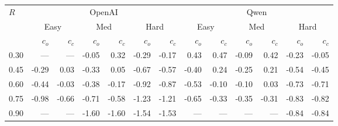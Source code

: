 \begin{tabular}{l*{12}{r}}
\toprule
  \multirow{2}{*}{$R$} & \multicolumn{6}{c}{OpenAI} & \multicolumn{6}{c}{Qwen} \\
  \cmidrule(lr){2-7} \cmidrule(lr){8-13}
  & \multicolumn{2}{c}{Easy} & \multicolumn{2}{c}{Med} & \multicolumn{2}{c}{Hard} & \multicolumn{2}{c}{Easy} & \multicolumn{2}{c}{Med} & \multicolumn{2}{c}{Hard} \\
  \cmidrule(lr){2-3} \cmidrule(lr){4-5} \cmidrule(lr){6-7} \cmidrule(lr){8-9} \cmidrule(lr){10-11} \cmidrule(lr){12-13}
  & $c_o$ & $c_c$ & $c_o$ & $c_c$ & $c_o$ & $c_c$ & $c_o$ & $c_c$ & $c_o$ & $c_c$ & $c_o$ & $c_c$ \\
\midrule
  0.30 & --- & --- & -0.05 & 0.32 & -0.29 & -0.17 & 0.43 & 0.47 & -0.09 & 0.42 & -0.23 & -0.05 \\
  0.45 & -0.29 & 0.03 & -0.33 & 0.05 & -0.67 & -0.57 & -0.40 & 0.24 & -0.25 & 0.21 & -0.54 & -0.45 \\
  0.60 & -0.44 & -0.03 & -0.38 & -0.17 & -0.92 & -0.87 & -0.53 & -0.10 & -0.10 & 0.03 & -0.73 & -0.71 \\
  0.75 & -0.98 & -0.66 & -0.71 & -0.58 & -1.23 & -1.21 & -0.65 & -0.33 & -0.35 & -0.31 & -0.83 & -0.82 \\
  0.90 & --- & --- & -1.60 & -1.60 & -1.54 & -1.53 & --- & --- & --- & --- & -0.84 & -0.84 \\
\bottomrule
\end{tabular}
